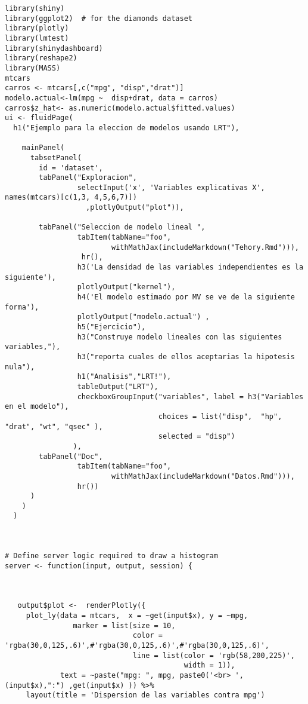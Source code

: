 \documentclass[peerreview]{IEEEtran}
\begin{document}
\begin{verbatim}
library(shiny)
library(ggplot2)  # for the diamonds dataset
library(plotly)
library(lmtest)
library(shinydashboard)
library(reshape2)
library(MASS)
mtcars 
carros <- mtcars[,c("mpg", "disp","drat")]
modelo.actual<-lm(mpg ~  disp+drat, data = carros)
carros$z_hat<- as.numeric(modelo.actual$fitted.values)
ui <- fluidPage(
  h1("Ejemplo para la eleccion de modelos usando LRT"),

    mainPanel(
      tabsetPanel(
        id = 'dataset',
        tabPanel("Exploracion",
                 selectInput('x', 'Variables explicativas X', names(mtcars)[c(1,3, 4,5,6,7)])
                   ,plotlyOutput("plot")),
        
        tabPanel("Seleccion de modelo lineal ",
                 tabItem(tabName="foo",
                         withMathJax(includeMarkdown("Tehory.Rmd"))),
                  hr(),
                 h3('La densidad de las variables independientes es la siguiente'),
                 plotlyOutput("kernel"),
                 h4('El modelo estimado por MV se ve de la siguiente forma'),
                 plotlyOutput("modelo.actual") ,
                 h5("Ejercicio"),
                 h3("Construye modelo lineales con las siguientes variables,"),
                 h3("reporta cuales de ellos aceptarias la hipotesis nula"),
                 h1("Analisis","LRT!"),
                 tableOutput("LRT"),
                 checkboxGroupInput("variables", label = h3("Variables en el modelo"), 
                                    choices = list("disp",  "hp", "drat", "wt", "qsec" ),
                                    selected = "disp")
                ),
        tabPanel("Doc",
                 tabItem(tabName="foo",
                         withMathJax(includeMarkdown("Datos.Rmd"))),
                 hr())
      )
    )
  )



# Define server logic required to draw a histogram
server <- function(input, output, session) {
  
  
  
   output$plot <-  renderPlotly({ 
     plot_ly(data = mtcars,  x = ~get(input$x), y = ~mpg,
                marker = list(size = 10,
                              color = 'rgba(30,0,125,.6)',#'rgba(30,0,125,.6)',#'rgba(30,0,125,.6)',
                              line = list(color = 'rgb(58,200,225)',
                                          width = 1)),
             text = ~paste("mpg: ", mpg, paste0('<br> ', (input$x),":") ,get(input$x) )) %>%
     layout(title = 'Dispersion de las variables contra mpg')
       

\end{verbatim}
\end{document}
